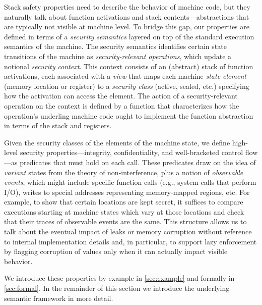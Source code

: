 \documentclass[10pt,conference]{ieeetran}%
\theoremstyle{definition}
\begin{document}
Stack safety properties need to describe the behavior of machine code, but they naturally
talk about function activations and stack contents---abstractions that
are typically not visible at machine level. To bridge this gap,
our properties are defined in terms of a {\em security semantics} layered on top of
the standard execution semantics of the machine.  The security semantics identifies certain
state transitions of the machine as {\em security-relevant operations}, which update
a notional {\em security context}.  This context consists of
an (abstract) stack of function activations, each associated with a {\em view}
that maps each machine {\em state element} (memory location or register)
to a {\em security class} (active, sealed, etc.) specifying how the activation
can access the element.
The action of a security-relevant operation on the context is defined by a function
that characterizes how the operation's underling machine code ought to
implement the function abstraction in terms of the stack and registers.

Given the security classes of the elements of the machine state, we
define high-level
security properties---integrity, confidentiality, and well-bracketed
control flow---as
predicates that must hold on each call. These predicates draw on the idea of
\emph{variant} states from the theory of non-interference, plus a notion of
{\em observable events}, which might include specific function calls (e.g., system
calls that perform I/O), writes to special addresses representing
memory-mapped regions, etc. For example, to show that certain locations are kept
secret, it suffices to compare executions starting at machine states which vary at those locations
and check that their traces of observable events are the same. This structure
allows us to talk about the eventual impact of leaks or memory corruption without
reference to internal implementation details and, in particular, to support lazy enforcement by
flagging corruption of values only when it can actually impact visible behavior.

We introduce these properties by example in \cref{sec:example} and
formally in \cref{sec:formal}. In the remainder
of this section we introduce the underlying semantic framework
in more detail.
\end{document}

